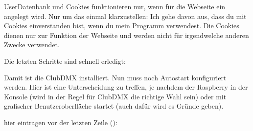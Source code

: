 \documentclass[letterpaper,10pt,ngerman]{sphinxmanual}
\begin{document}
User\sphinxhyphen{}Datenbank und Cookies funktionieren nur, wenn für die Webseite ein
 angelegt wird. Nur um das einmal klarzustellen: Ich gehe davon aus,
dass du mit Cookies einverstanden bist, wenn du mein Programm verwendest. Die
Cookies dienen nur zur Funktion der Webseite und werden nicht für irgendwelche
anderen Zwecke verwendet.

\begin{sphinxVerbatim}[commandchars=\\\{\}]
 
 
  
\end{sphinxVerbatim}


Die letzten Schritte sind schnell erledigt:

\begin{sphinxVerbatim}[commandchars=\\\{\}]
 
 
  
 
\end{sphinxVerbatim}


Damit ist die ClubDMX installiert. Nun muss noch Autostart
konfiguriert werden. Hier ist eine Unterscheidung zu treffen, je nachdem
der Raspberry in der Konsole  (wird in der Regel für ClubDMX die richtige
Wahl sein) oder mit grafischer Benutzeroberfläche startet (auch dafür wird es
Gründe geben).



hier eintragen vor der letzten Zeile ():

\begin{sphinxVerbatim}[commandchars=\\\{\}]
    
\end{sphinxVerbatim}
\end{document}

